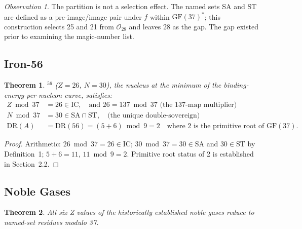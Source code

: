 \documentclass[11pt]{article}
\newtheorem{theorem}{Theorem}
\theoremstyle{remark}
\newtheorem{observation}{Observation}
\begin{document}
\begin{observation}
The partition is not a selection effect. The named sets SA and ST are defined as a
pre-image/image pair under $f$ within $\mathrm{GF}(37)^*$; this construction selects
25 and 21 from $\mathcal{O}_{28}$ and leaves 28 as the gap. The gap existed prior to
examining the magic-number list.
\end{observation}

\subsection{Iron-56}

\begin{theorem}
${}^{56}$ ($Z=26$, $N=30$), the nucleus at the minimum of the
binding-energy-per-nucleon curve, satisfies:
\begin{align*}
  Z \bmod 37 &= 26 \in \mathrm{IC},\quad\text{and } 26 = 137\bmod 37
                                      \text{ (the 137-map multiplier)}\\
  N \bmod 37 &= 30 \in \mathrm{SA}\cap\mathrm{ST},\quad\text{(the unique double-sovereign)}\\
  \mathrm{DR}(A) &= \mathrm{DR}(56) = (5+6)\bmod 9 = 2
                      \quad\text{where 2 is the primitive root of }\mathrm{GF}(37).
\end{align*}
\end{theorem}

\begin{proof}
Arithmetic: $26\bmod 37 = 26\in\mathrm{IC}$; $30\bmod 37 = 30\in\mathrm{SA}$ and
$30\in\mathrm{ST}$ by Definition~1; $5+6=11$, $11\bmod 9=2$. Primitive root status
of 2 is established in Section~2.2.
\end{proof}

\subsection{Noble Gases}

\begin{theorem}
All six Z values of the historically established noble gases reduce to named-set
residues modulo 37.
\end{theorem}
\end{document}
